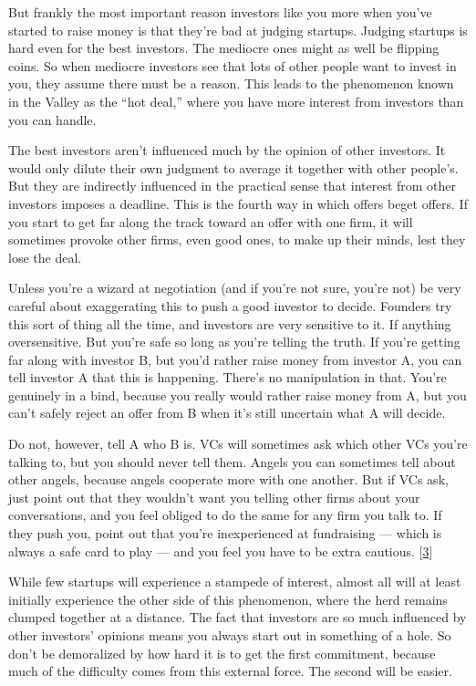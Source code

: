 But frankly the most important reason investors like you more when
you've started to raise money is that they're bad at judging startups.
Judging startups is hard even for the best investors. The mediocre ones
might as well be flipping coins. So when mediocre investors see that
lots of other people want to invest in you, they assume there must be a
reason. This leads to the phenomenon known in the Valley as the ``hot
deal,'' where you have more interest from investors than you can handle.

The best investors aren't influenced much by the opinion of other
investors. It would only dilute their own judgment to average it
together with other people's. But they are indirectly influenced in the
practical sense that interest from other investors imposes a deadline.
This is the fourth way in which offers beget offers. If you start to get
far along the track toward an offer with one firm, it will sometimes
provoke other firms, even good ones, to make up their minds, lest they
lose the deal.

Unless you're a wizard at negotiation (and if you're not sure, you're
not) be very careful about exaggerating this to push a good investor to
decide. Founders try this sort of thing all the time, and investors are
very sensitive to it. If anything oversensitive. But you're safe so long
as you're telling the truth. If you're getting far along with investor
B, but you'd rather raise money from investor A, you can tell investor A
that this is happening. There's no manipulation in that. You're
genuinely in a bind, because you really would rather raise money from A,
but you can't safely reject an offer from B when it's still uncertain
what A will decide.

Do not, however, tell A who B is. VCs will sometimes ask which other VCs
you're talking to, but you should never tell them. Angels you can
sometimes tell about other angels, because angels cooperate more with
one another. But if VCs ask, just point out that they wouldn't want you
telling other firms about your conversations, and you feel obliged to do
the same for any firm you talk to. If they push you, point out that
you're inexperienced at fundraising --- which is always a safe card to
play --- and you feel you have to be extra cautious.
{[}\hyperref[f3n]{3}{]}

While few startups will experience a stampede of interest, almost all
will at least initially experience the other side of this phenomenon,
where the herd remains clumped together at a distance. The fact that
investors are so much influenced by other investors' opinions means you
always start out in something of a hole. So don't be demoralized by how
hard it is to get the first commitment, because much of the difficulty
comes from this external force. The second will be easier.

